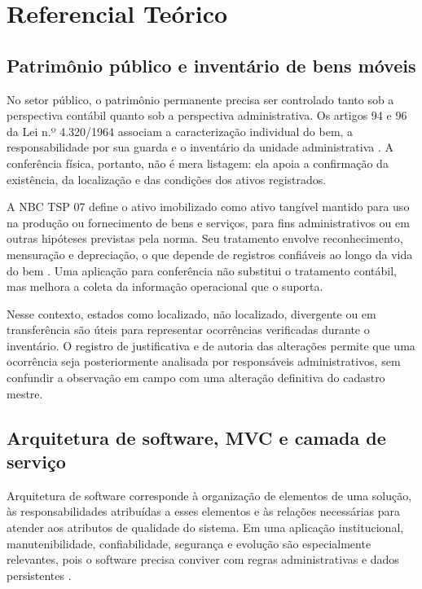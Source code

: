 \documentclass[12pt,a4paper]{article}
\begin{document}
\section{Referencial Teórico}

\subsection{Patrimônio público e inventário de bens móveis}

No setor público, o patrimônio permanente precisa ser controlado tanto sob a
perspectiva contábil quanto sob a perspectiva administrativa. Os artigos 94 e
96 da Lei n.º 4.320/1964 associam a caracterização individual do bem, a
responsabilidade por sua guarda e o inventário da unidade administrativa
\cite{brasil4320}. A conferência física, portanto, não é mera listagem: ela
apoia a confirmação da existência, da localização e das condições dos ativos
registrados.

A NBC TSP 07 define o ativo imobilizado como ativo tangível mantido para uso na
produção ou fornecimento de bens e serviços, para fins administrativos ou em
outras hipóteses previstas pela norma. Seu tratamento envolve reconhecimento,
mensuração e depreciação, o que depende de registros confiáveis ao longo da
vida do bem \cite{cfcnbctsp07}. Uma aplicação para conferência não substitui o
tratamento contábil, mas melhora a coleta da informação operacional que o
suporta.

Nesse contexto, estados como localizado, não localizado, divergente ou em
transferência são úteis para representar ocorrências verificadas durante o
inventário. O registro de justificativa e de autoria das alterações permite que
uma ocorrência seja posteriormente analisada por responsáveis administrativos,
sem confundir a observação em campo com uma alteração definitiva do cadastro
mestre.

\subsection{Arquitetura de software, MVC e camada de serviço}

Arquitetura de software corresponde à organização de elementos de uma solução,
às responsabilidades atribuídas a esses elementos e às relações necessárias
para atender aos atributos de qualidade do sistema. Em uma aplicação
institucional, manutenibilidade, confiabilidade, segurança e evolução são
especialmente relevantes, pois o software precisa conviver com regras
administrativas e dados persistentes \cite{bass2021}.
\end{document}
